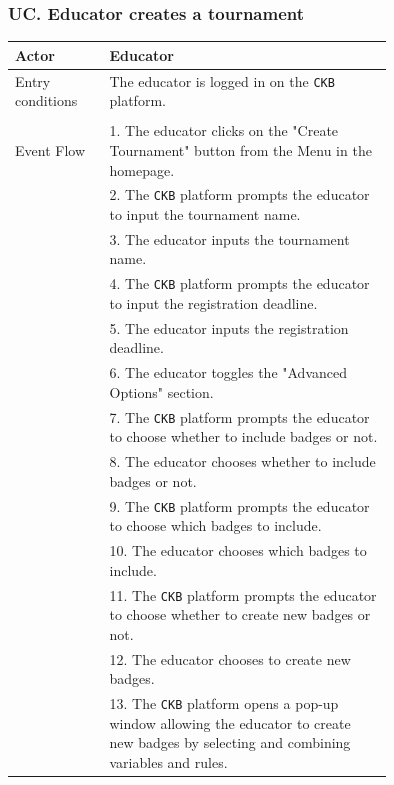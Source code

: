 \subsubsection*{UC\cuc . Educator creates a tournament}

\begin{center}
    \begin{longtable}{lp{0.75\linewidth}}
        \hline
        Actor            & Educator                                                                                                                                                                               \\
        \hline
        Entry conditions & The educator is logged in on the \verb|CKB| platform.\\                                                                                                               \\
        \hline
        Event Flow       
        & 1. The educator clicks on the "Create Tournament" button from the Menu in the homepage.\\
        & 2. The \verb|CKB| platform prompts the educator to input the tournament name.\\
        & 3. The educator inputs the tournament name.\\
        & 4. The \verb|CKB| platform prompts the educator to input the registration deadline.\\
        & 5. The educator inputs the registration deadline.\\
        & 6. The educator toggles the "Advanced Options" section.\\
        & 7. The \verb|CKB| platform prompts the educator to choose whether to include badges or not.\\
        & 8. The educator chooses whether to include badges or not.\\
        & 9. The \verb|CKB| platform prompts the educator to choose which badges to include.\\
        & 10. The educator chooses which badges to include.\\
        & 11. The \verb|CKB| platform prompts the educator to choose whether to create new badges or not.\\
        & 12. The educator chooses to create new badges.\\
        & 13. The \verb|CKB| platform opens a pop-up window allowing the educator to create new badges by selecting and combining variables and rules.\\

\end{longtable}
\end{center}
